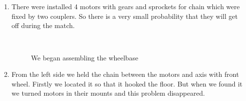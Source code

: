 \begin{enumerate}
\begin{enumerate}
		\item There were installed 4 motors with gears and sprockets for chain which were fixed by two couplers. So there is a very small probability that they will get off during the match.
		\begin{figure}[H]
			\begin{minipage}[h]{0.2\linewidth}
				\center  
			\end{minipage}
			\begin{minipage}[h]{0.6\linewidth}
				\caption{We began assembling the wheelbase}
			\end{minipage}
		\end{figure}
		
		\item From the left side we held the chain between the motors and axis with front wheel. Firstly we located it so that it hooked the floor. But when we found it we turned motors in their mounts and this problem disappeared.
		

\end{enumerate}
\end{enumerate}
